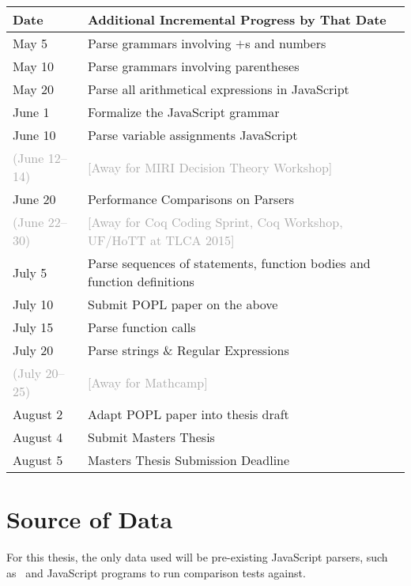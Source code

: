 \documentclass{article}
\begin{document}
  \newcommand{\away}[1]{\textcolor{darkgray}{#1}}%
  \newcommand{\awayd}[1]{\away{(#1)}}%
  \newcommand{\awayb}[1]{\away{[Away for #1]}}%
  \begin{center}
  \begin{tabular}{l|l}
  Date & Additional Incremental Progress by That Date \\ \hline
  May 5 & Parse grammars involving $+$s and numbers \\
  May 10 & Parse grammars involving parentheses \\
  May 20 & Parse all arithmetical expressions in JavaScript \\
  June 1 & Formalize the JavaScript grammar \\
  June 10 & Parse variable assignments JavaScript \\
  \awayd{June 12--14} & \awayb{MIRI Decision Theory Workshop} \\
  June 20 & Performance Comparisons on Parsers \\
  \awayd{June 22--30} & \awayb{Coq Coding Sprint, Coq Workshop, UF/HoTT at TLCA 2015} \\
  July 5 & Parse sequences of statements, function bodies and function definitions \\
  July 10 & Submit POPL paper on the above \\
  July 15 & Parse function calls \\
  July 20 & Parse strings \& Regular Expressions \\
  \awayd{July 20--25} & \awayb{Mathcamp} \\
  August 2 & Adapt POPL paper into thesis draft \\
  August 4 & Submit Masters Thesis \\
  August 5 & Masters Thesis Submission Deadline
  \end{tabular}
  \end{center}

\section{Source of Data}
  For this thesis, the only data used will be pre-existing JavaScript parsers, such as~\cite{esprima,v8}
  and JavaScript programs to run comparison tests against.

\nocite{*}


\end{document}
